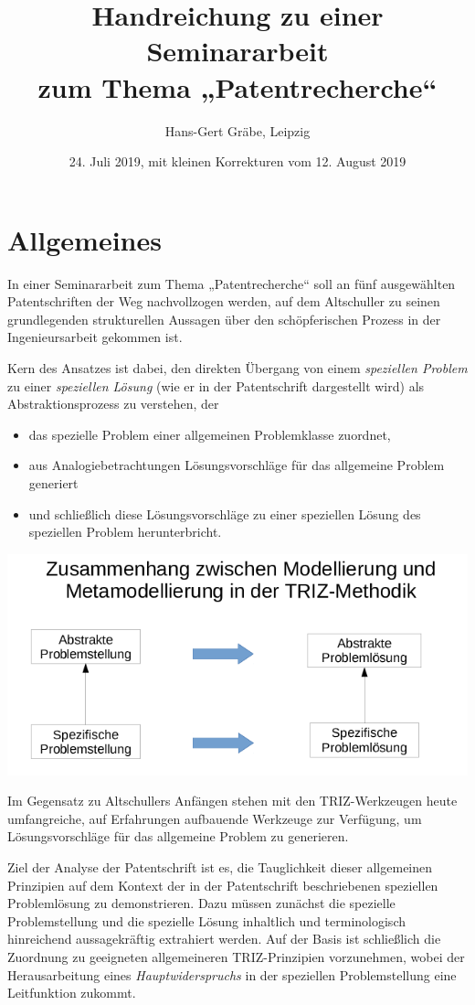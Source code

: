 \documentclass[11pt,a4paper]{article}
\title{Handreichung zu einer Seminararbeit\\[4pt] zum Thema „Patentrecherche“}
\author{Hans-Gert Gräbe, Leipzig}
\date{24. Juli 2019, mit kleinen Korrekturen vom 12. August 2019}
\begin{document}
\maketitle

\section{Allgemeines}

In einer Seminararbeit zum Thema „Patentrecherche“ soll an fünf ausgewählten
Patentschriften der Weg nachvollzogen werden, auf dem Altschuller zu seinen
grundlegenden strukturellen Aussagen über den schöpferischen Prozess in der
Ingenieursarbeit gekommen ist.

Kern des Ansatzes ist dabei, den direkten Übergang von einem \emph{speziellen
  Problem} zu einer \emph{speziellen Lösung} (wie er in der Patentschrift
dargestellt wird) als Abstraktionsprozess zu verstehen, der
\begin{itemize}
\item das spezielle Problem einer allgemeinen Problemklasse zuordnet,
\item aus Analogiebetrachtungen Lösungsvorschläge für das allgemeine Problem
  generiert
\item und schließlich diese Lösungsvorschläge zu einer speziellen Lösung des
  speziellen Problem herunterbricht.
\end{itemize}
\begin{center}
  \includegraphics[width=.7\textwidth]{2019-04-25/Folie-1.png}
\end{center}
Im Gegensatz zu Altschullers Anfängen stehen mit den TRIZ-Werkzeugen heute
umfangreiche, auf Erfahrungen aufbauende Werkzeuge zur Verfügung, um
Lösungsvorschläge für das allgemeine Problem zu generieren.

Ziel der Analyse der Patentschrift ist es, die Tauglichkeit dieser allgemeinen
Prinzipien auf dem Kontext der in der Patentschrift beschriebenen speziellen
Problemlösung zu demonstrieren.  Dazu müssen zunächst die spezielle
Problemstellung und die spezielle Lösung inhaltlich und terminologisch
hinreichend aussagekräftig extrahiert werden. Auf der Basis ist schließlich
die Zuordnung zu geeigneten allgemeineren TRIZ-Prinzipien vorzunehmen, wobei
der Herausarbeitung eines \emph{Hauptwiderspruchs} in der speziellen
Problemstellung eine Leitfunktion zukommt.
\end{document}
